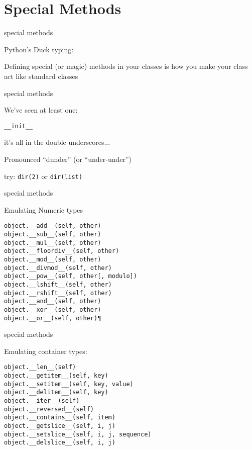 \documentclass{beamer}
\begin{document}
\section{Special Methods}

\begin{frame}[fragile]{special methods}

{\Large Python's Duck typing:}

\vfill
{\Large Defining special (or magic) methods in your classes is how you make
your class act like standard classes}

\end{frame} 

\begin{frame}[fragile]{special methods}

{\Large We've seen at least one:}

\begin{verbatim}
__init__
\end{verbatim}

\vfill
{\Large it's all in the double underscores...}

\vfill
{\Large Pronounced ``dunder'' (or ``under-under'') }

\vfill
{\Large try: \verb|dir(2)| or \verb|dir(list)|}

\end{frame} 

\begin{frame}[fragile]{special methods}

{\Large Emulating Numeric types}

\begin{verbatim}
object.__add__(self, other)
object.__sub__(self, other)
object.__mul__(self, other)
object.__floordiv__(self, other)
object.__mod__(self, other)
object.__divmod__(self, other)
object.__pow__(self, other[, modulo])
object.__lshift__(self, other)
object.__rshift__(self, other)
object.__and__(self, other)
object.__xor__(self, other)
object.__or__(self, other)¶
\end{verbatim}

\end{frame} 

\begin{frame}[fragile]{special methods}

{\Large Emulating container types:}

\begin{verbatim}
object.__len__(self)
object.__getitem__(self, key)
object.__setitem__(self, key, value)
object.__delitem__(self, key)
object.__iter__(self)
object.__reversed__(self)
object.__contains__(self, item)
object.__getslice__(self, i, j)
object.__setslice__(self, i, j, sequence)
object.__delslice__(self, i, j)
\end{verbatim}

\end{frame} 
\end{document}
